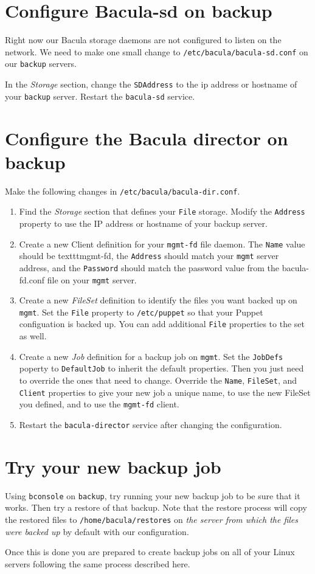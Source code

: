 \documentclass{article}   	%
\begin{document}
\section{Configure Bacula-sd on backup}
Right now our Bacula storage daemons are not configured to listen on the network.  We need to make one small change to \texttt{/etc/bacula/bacula-sd.conf} on our \texttt{backup} servers.

In the \emph{Storage} section, change the \texttt{SDAddress} to the ip address or hostname of your \texttt{backup} server.  Restart the \texttt{bacula-sd} service.

\section{Configure the Bacula director on backup}
Make the following changes in \texttt{/etc/bacula/bacula-dir.conf}.
\begin{enumerate}
  \item Find the \emph{Storage} section that defines your \texttt{File} storage.  Modify the \texttt{Address} property to use the IP address or hostname of your backup server.
  \item Create a new Client definition for your \texttt{mgmt-fd} file daemon.  The \texttt{Name} value should be texttt{mgmt-fd}, the \texttt{Address} should match your \texttt{mgmt} server address, and the \texttt{Password} should match the password value from the bacula-fd.conf file on your \texttt{mgmt} server.
  \item Create a new \emph{FileSet} definition to identify the files you want backed up on \texttt{mgmt}.  Set the \texttt{File} property to \texttt{/etc/puppet} so that your Puppet configuation is backed up.  You can add additional \texttt{File} properties to the set as well.
  \item Create a new \emph{Job} definition for a backup job on \texttt{mgmt}.  Set the \texttt{JobDefs} poperty to \texttt{DefaultJob} to inherit the default properties.  Then you just need to override the ones that need to change.  Override the \texttt{Name}, \texttt{FileSet}, and \texttt{Client} properties to give your new job a unique name, to use the new FileSet you defined, and to use the \texttt{mgmt-fd} client.
  \item Restart the \texttt{bacula-director} service after changing the configuration.

\end{enumerate}

\section{Try your new backup job}
Using \texttt{bconsole} on \texttt{backup}, try running your new backup job to be sure that it works.  Then try a restore of that backup.  Note that the restore process will copy the restored files to \texttt{/home/bacula/restores} on \emph{the server from which the files were backed up} by default with our configuration.

Once this is done you are prepared to create backup jobs on all of your Linux servers following the same process described here.
\end{document}
